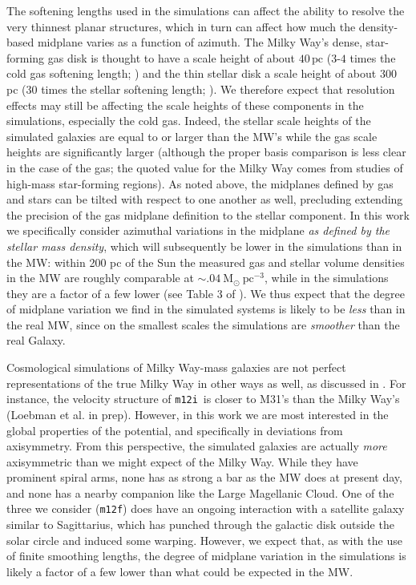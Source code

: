 \documentclass[twocolumn]{aastex62}
\newcommand{\Msun}{\ensuremath{\text{M}_\odot}}
\newcommand{\pc}{\text{pc}}
\newcommand{\unit}[2]{\ensuremath{\textrm{#1}^{\mathrm{#2}}}}
\newcommand{\mi}{\texttt{m12i}}
\newcommand{\mf}{\texttt{m12f}}
\begin{document}
The softening lengths used in the simulations can affect the ability to
resolve the very thinnest planar structures, which in turn can affect how much
the density-based midplane varies as a function of azimuth. The Milky Way's
dense, star-forming gas disk is thought to have a scale height of about $40\,\pc$
($3\text{-}4$ times the cold gas softening length; \citealt{2019ApJ...871..145A}) and
the thin stellar disk a scale height of about 300 pc (30 times the stellar
softening length; \citealt{2008ApJ...673..864J}). We therefore expect that
resolution effects may still be affecting the scale heights of these
components in the simulations, especially the cold gas. Indeed, the stellar
scale heights of the simulated galaxies are equal to or larger than the MW's
while the gas scale heights are significantly larger (although the proper
basis comparison is less clear in the case of the gas; the quoted value for
the Milky Way comes from studies of high-mass star-forming regions). As noted
above, the midplanes defined by gas and stars can be tilted with respect to
one another as well, precluding extending the precision of the gas midplane
definition to the stellar component. In this work we specifically consider
azimuthal variations in the midplane \emph{as defined by the stellar mass
density}, which will subsequently be lower in the simulations than in the MW:
within 200 pc of the Sun the measured gas and stellar volume densities in the
MW are roughly comparable at $\sim .04\ \Msun\
\unit{pc}{-3}$, while in the simulations they are a factor of a few lower (see
Table 3 of \citealt{2018arXiv180610564S}). We thus expect that the degree of
midplane variation we find in the simulated systems is likely to be
\emph{less} than in the real MW, since on the smallest scales the simulations
are \emph{smoother} than the real Galaxy.


Cosmological simulations of Milky Way-mass galaxies are not perfect
representations of the true Milky Way in other ways as well, as discussed in
\citet{2018arXiv180610564S}. For instance, the velocity structure of \mi\ is
closer to M31's than the Milky Way's (Loebman et al. in prep). However, in
this work we are most interested in the global properties of the potential,
and specifically in deviations from axisymmetry. From this perspective, the
simulated galaxies are actually \emph{more} axisymmetric than we might expect
of the Milky Way. While they have prominent spiral arms, none has as strong a
bar as the MW does at present day, and none has a nearby companion like the
Large Magellanic Cloud. One of the three we consider (\mf) does have an
ongoing interaction with a satellite galaxy similar to Sagittarius, which has
punched through the galactic disk outside the solar circle and induced some
warping. However, we expect that, as with the use of finite smoothing lengths,
the degree of midplane variation in the simulations is likely a factor of a
few lower than what could be expected in the MW.
\end{document}
